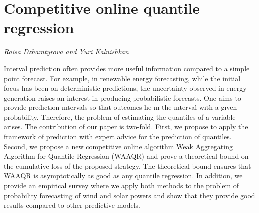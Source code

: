 \documentclass[../booklet.tex]{subfiles}
\begin{document}
\section[Competitive online quantile regression. {\it Raisa Dzhamtyrova and Yuri Kalnishkan}]{Competitive online quantile regression}
 

\begin{center}
  {\it Raisa Dzhamtyrova and Yuri Kalnishkan}
\end{center}

\vskip 0.8cm


 Interval prediction often provides more useful information compared to a simple point forecast. For example, in renewable energy forecasting, while the initial focus has been on deterministic predictions, the uncertainty observed in energy generation raises an interest in producing probabilistic forecasts. One aims to provide prediction intervals so that outcomes lie in the interval with a given probability. Therefore, the problem of estimating the quantiles of a variable arises. The contribution of our paper is two-fold. First, we propose to apply the framework of prediction with expert advice for the prediction of quantiles. Second, we propose a new competitive online algorithm Weak Aggregating Algorithm for Quantile Regression (WAAQR) and prove a theoretical bound on the cumulative loss of the proposed strategy. The theoretical bound ensures that WAAQR is asymptotically as good as any quantile regression. In addition, we provide an empirical survey where we apply both methods to the problem of probability forecasting of wind and solar powers and show that they provide good results compared to other predictive models.

\end{document}
